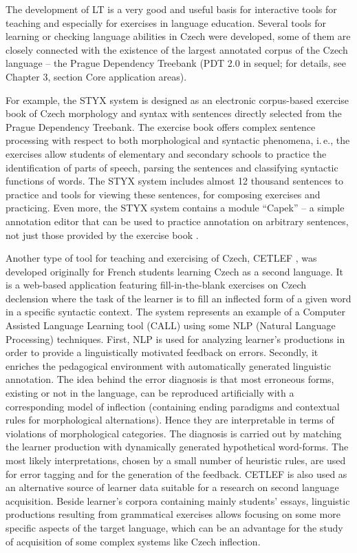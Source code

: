 \begin{multicols}{2}
The development of LT is a very good and useful basis for interactive tools for teaching and especially for exercises in language education. Several tools for learning or checking language abilities in Czech were developed, some of them are closely connected with the existence of the largest annotated corpus of the Czech language -- the Prague Dependency Treebank (PDT 2.0 in sequel; for details, see Chapter 3, section Core application areas).

For example, the STYX system is designed as an electronic corpus-based exercise book of Czech morphology and syntax with sentences directly selected from the Prague Dependency Treebank. The exercise book offers complex sentence processing with respect to both morphological and syntactic phenomena, i.\,e., the exercises allow students of elementary and secondary schools to practice the identification of parts of speech, parsing the sentences and classifying syntactic functions of words. The STYX system includes almost 12 thousand sentences to practice and tools for viewing these sentences, for composing exercises and practicing. Even more, the STYX system contains a module “Capek” -- a simple annotation editor that can be used to practice annotation on arbitrary sentences, not just those provided by the exercise book \cite{Note8}.

Another type of tool for teaching and exercising of Czech, CETLEF \cite{Note9}, was developed originally for French students learning Czech as a second language. It is a web-based application featuring fill-in-the-blank exercises on Czech declension where the task of the learner is to fill an inflected form of a given word in a specific syntactic context. The system represents an example of a Computer Assisted Language Learning tool (CALL) using some NLP (Natural Language Processing) techniques. First, NLP is used for analyzing learner’s productions in order to provide a linguistically motivated feedback on errors. Secondly, it enriches the pedagogical environment with automatically generated linguistic annotation. The idea behind the error diagnosis is that most erroneous forms, existing or not in the language, can be reproduced artificially with a corresponding model of inflection (containing ending paradigms and contextual rules for morphological alternations). Hence they are interpretable in terms of violations of morphological categories. The diagnosis is carried out by matching the learner production with dynamically generated hypothetical word-forms. The most likely interpretations, chosen by a small number of heuristic rules, are used for error tagging and for the generation of the feedback. CETLEF is also used as an alternative source of learner data suitable for a research on second language acquisition. Beside learner’s corpora containing mainly students’ essays, linguistic productions resulting from grammatical exercises allows focusing on some more specific aspects of the target language, which can be an advantage for the study of acquisition of some complex systems like Czech inflection.


\end{multicols}

